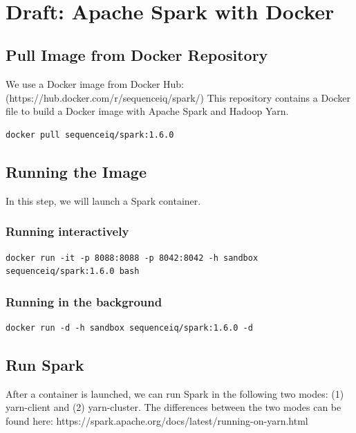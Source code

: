 
\FILENAME\

\section{Draft: Apache Spark with Docker}\label{s:apache-spark-with-docker}

\subsection{Pull Image from Docker
Repository}

We use a Docker image from Docker Hub:
(https://hub.docker.com/r/sequenceiq/spark/) This repository contains a
Docker file to build a Docker image with Apache Spark and Hadoop Yarn.

\begin{lstlisting}
docker pull sequenceiq/spark:1.6.0
\end{lstlisting}

\subsection{Running the Image}

In this step, we will launch a Spark container.

\subsubsection{Running interactively}

\begin{lstlisting}
docker run -it -p 8088:8088 -p 8042:8042 -h sandbox sequenceiq/spark:1.6.0 bash
\end{lstlisting}

\subsubsection{Running in the
background}

\begin{lstlisting}
docker run -d -h sandbox sequenceiq/spark:1.6.0 -d
\end{lstlisting}

\subsection{Run Spark}

After a container is launched, we can run Spark in the following two
modes: (1) yarn-client and (2) yarn-cluster. The differences between the
two modes can be found here:
https://spark.apache.org/docs/latest/running-on-yarn.html

